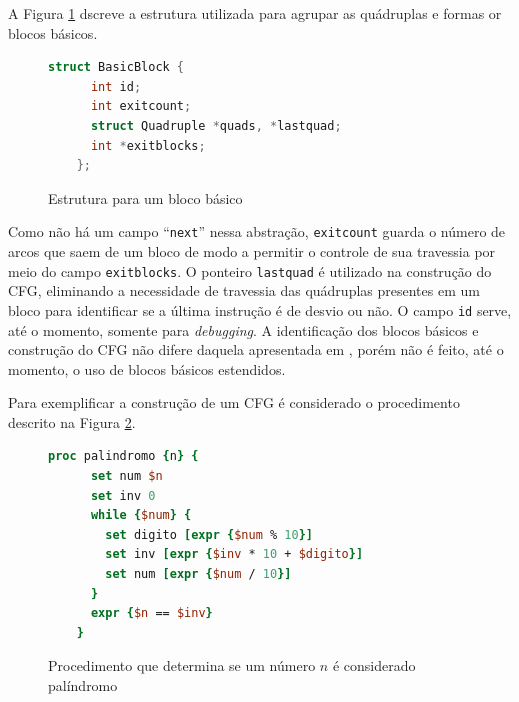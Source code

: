 A Figura \ref{struct-bb} dscreve a estrutura utilizada para agrupar as
quádruplas e formas or blocos básicos.

\begin{figure}[h]
  \centering
  \begin{lstlisting}[language=C]
    struct BasicBlock {
      int id;
      int exitcount;
      struct Quadruple *quads, *lastquad;
      int *exitblocks;
    };
  \end{lstlisting}
  \caption{Estrutura para um bloco básico\label{struct-bb}}
\end{figure}

Como não há um campo ``\verb!next!'' nessa abstração, \verb!exitcount!
guarda o número de arcos que saem de um bloco de modo a
permitir o controle de sua travessia por meio do campo
\verb!exitblocks!. O ponteiro \verb!lastquad! é
utilizado na construção do CFG, eliminando a necessidade de travessia das
quádruplas presentes em um bloco para identificar se a última
instrução é de desvio ou não. O campo \verb!id! serve, até o momento,
somente para \textit{debugging}. A identificação dos blocos básicos e
construção do CFG não difere daquela apresentada em
, porém não é feito, até o momento, o
uso de blocos básicos estendidos.%

Para exemplificar a construção de um CFG é considerado o procedimento
descrito na Figura \ref{fig:gray}.

\begin{figure}[h]
  \centering
  \begin{lstlisting}[language=Tcl]
    proc palindromo {n} {
      set num $n
      set inv 0
      while {$num} {
        set digito [expr {$num % 10}]
        set inv [expr {$inv * 10 + $digito}]
        set num [expr {$num / 10}]
      }
      expr {$n == $inv}
    }
  \end{lstlisting}
  \caption{Procedimento que determina se um número $n$ é considerado palíndromo\label{fig:gray}}
\end{figure}

